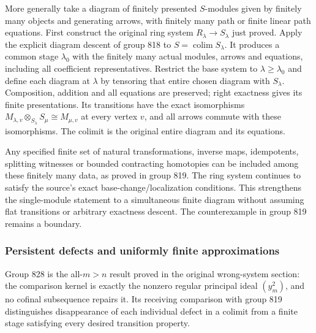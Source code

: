 More generally take a diagram of finitely presented \(S\)-modules given by finitely many objects and generating arrows, with finitely many path or finite linear path equations. First construct the original ring system \(R_\lambda\to S_\lambda\) just proved. Apply the explicit diagram descent of group 818 to \(S=\operatorname{colim}S_\lambda\). It produces a common stage \(\lambda_0\) with the finitely many actual modules, arrows and equations, including all coefficient representatives. Restrict the base system to \(\lambda\ge\lambda_0\) and define each diagram at \(\lambda\) by tensoring that entire chosen diagram with \(S_\lambda\). Composition, addition and all equations are preserved; right exactness gives its finite presentations. Its transitions have the exact isomorphisms \(M_{\lambda,v}\otimes_{S_\lambda}S_\mu\cong M_{\mu,v}\) at every vertex \(v\), and all arrows commute with these isomorphisms. The colimit is the original entire diagram and its equations.

Any specified finite set of natural transformations, inverse maps, idempotents, splitting witnesses or bounded contracting homotopies can be included among these finitely many data, as proved in group 819. The ring system continues to satisfy the source's exact base-change/localization conditions. This strengthens the single-module statement to a simultaneous finite diagram without assuming flat transitions or arbitrary exactness descent. The counterexample in group 819 remains a boundary.

\subsubsection{Persistent defects and uniformly finite approximations}\label{persistent-defects-and-uniformly-finite-approximations}

Group 828 is the all-\(m>n\) result proved in the original wrong-system section: the comparison kernel is exactly the nonzero regular principal ideal \((y_m^2)\), and no cofinal subsequence repairs it. Its receiving comparison with group 819 distinguishes disappearance of each individual defect in a colimit from a finite stage satisfying every desired transition property.

